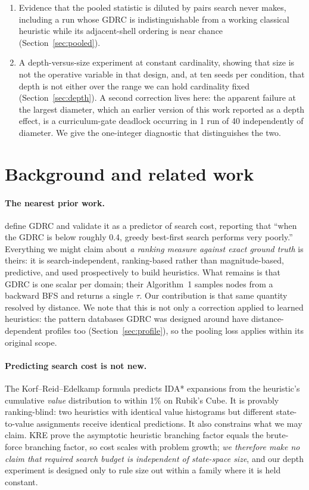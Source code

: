 \documentclass{article}
\begin{document}
\begin{enumerate}
about $\tieinflationmean$, enough to reverse comparisons of the kind this statistic is
routinely used for (Section~\ref{sec:pooled}).
\item Evidence that the pooled statistic is diluted by pairs search never makes,
including a run whose GDRC is indistinguishable from a working classical
heuristic while its adjacent-shell ordering is near chance
(Section~\ref{sec:pooled}).
\item A depth-versus-size experiment at constant cardinality, showing that size is
not the operative variable in that design, and, at ten seeds per condition,
that depth is not either over the range we can hold cardinality fixed
(Section~\ref{sec:depth}). A second correction lives here: the apparent failure
at the largest diameter, which an earlier version of this work reported as a
depth effect, is a curriculum-gate deadlock occurring in 1 run of 40 independently
of diameter. We give the one-integer diagnostic that distinguishes the two.
\end{enumerate}

\section{Background and related work}
\label{sec:related}

\paragraph{The nearest prior work.} \citet{wilt2016} define GDRC and validate it
as a predictor of search cost, reporting that ``when the GDRC is below roughly
0.4, greedy best-first search performs very poorly.'' Everything we might claim
about \emph{a ranking measure against exact ground truth} is theirs: it is
search-independent, ranking-based rather than magnitude-based, predictive, and
used prospectively to build heuristics. What remains is that GDRC is one scalar
per domain; their Algorithm~1 samples nodes from a backward BFS and returns a
single $\tau$. Our contribution is that same quantity resolved by distance. We
note that this is not only a correction applied to learned heuristics: the
pattern databases GDRC was designed around have distance-dependent profiles too
(Section~\ref{sec:profile}), so the pooling loss applies within its original
scope.

\paragraph{Predicting search cost is not new.} The Korf--Reid--Edelkamp formula
\citep{korf2001} predicts IDA* expansions from the heuristic's cumulative
\emph{value} distribution to within 1\% on Rubik's Cube. It is provably
ranking-blind: two heuristics with identical value histograms but different
state-to-value assignments receive identical predictions. It also constrains what
we may claim. KRE prove the asymptotic heuristic branching factor equals the
brute-force branching factor, so cost scales with problem growth; \emph{we
therefore make no claim that required search budget is independent of
state-space size}, and our depth experiment is designed only to rule size out
within a family where it is held constant.
\end{document}
